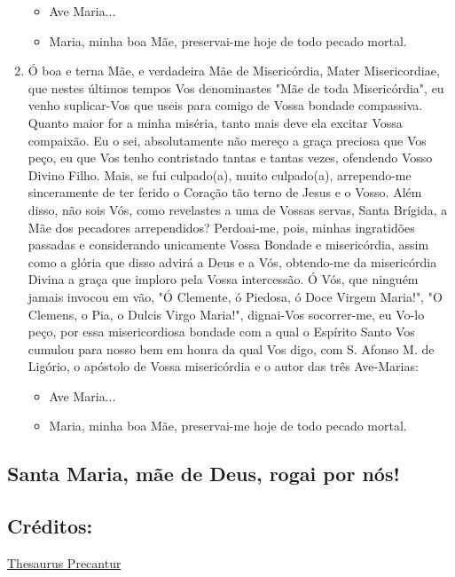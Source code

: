 \documentclass[18pt]{article}
\begin{document}
\begin{justify}
\begin{enumerate}
  \begin{itemize}
   \item Ave Maria...
   \item Maria, minha boa Mãe, preservai-me hoje de todo pecado mortal.
  \end{itemize}

\item Ó boa e terna Mãe, e verdadeira Mãe de Misericórdia, Mater Misericordiae, que nestes últimos tempos Vos denominastes "Mãe de toda Misericórdia", eu venho suplicar-Vos que useis para comigo de Vossa bondade compassiva. Quanto maior for a minha miséria, tanto mais deve ela excitar Vossa compaixão. Eu o sei, absolutamente não mereço a graça preciosa que Vos peço, eu que Vos tenho contristado tantas e tantas vezes, ofendendo Vosso Divino Filho. Mais, se fui culpado(a), muito culpado(a), arrependo-me sinceramente de ter ferido o Coração tão terno de Jesus e o Vosso. Além disso, não sois Vós, como revelastes a uma de Vossas servas, Santa Brígida, a Mãe dos pecadores arrependidos? Perdoai-me, pois, minhas ingratidões passadas e considerando unicamente Vossa Bondade e misericórdia, assim como a glória que disso advirá a Deus e a Vós, obtendo-me da misericórdia Divina a graça que imploro pela Vossa intercessão. Ó Vós, que ninguém jamais invocou em vão, "Ó Clemente, ó Piedosa, ó Doce Virgem Maria!", "O Clemens, o Pia, o Dulcis Virgo Maria!", dignai-Vos socorrer-me, eu Vo-lo peço, por essa misericordiosa bondade com a qual o Espírito Santo Vos cumulou para nosso bem em honra da qual Vos digo, com S. Afonso M. de Ligório, o apóstolo de Vossa misericórdia e o autor das três Ave-Marias:

  \begin{itemize}
   \item Ave Maria...
   \item Maria, minha boa Mãe, preservai-me hoje de todo pecado mortal.
  \end{itemize}

\end{enumerate}

\vfill
\begin{center}
\section*{Santa Maria, mãe de Deus, rogai por nós!}
\end{center}

\vfill
\subsection*{Créditos:}
\href{https://precantur.blogspot.com/2013/02/novena-das-tres-ave-marias-ii.html}{Thesaurus Precantur}



\end{justify}
\end{document}
